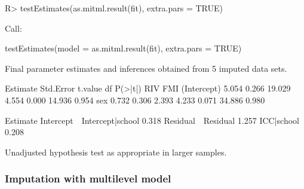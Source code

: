 \documentclass[
]{jss}
\begin{document}
\begin{CodeChunk}
\begin{CodeInput}
R> testEstimates(as.mitml.result(fit), extra.pars = TRUE)
\end{CodeInput}
\begin{CodeOutput}

Call:

testEstimates(model = as.mitml.result(fit), extra.pars = TRUE)

Final parameter estimates and inferences obtained from 5 imputed data sets.

             Estimate Std.Error   t.value        df   P(>|t|)       RIV       FMI 
(Intercept)     5.054     0.266    19.029     4.554     0.000    14.936     0.954 
sex             0.732     0.306     2.393     4.233     0.071    34.886     0.980 

                            Estimate 
Intercept~~Intercept|school    0.318 
Residual~~Residual             1.257 
ICC|school                     0.208 

Unadjusted hypothesis test as appropriate in larger samples.
\end{CodeOutput}
\end{CodeChunk}

\hypertarget{imputation-with-multilevel-model}{%
\subsubsection{Imputation with multilevel
model}\label{imputation-with-multilevel-model}}
\end{document}
